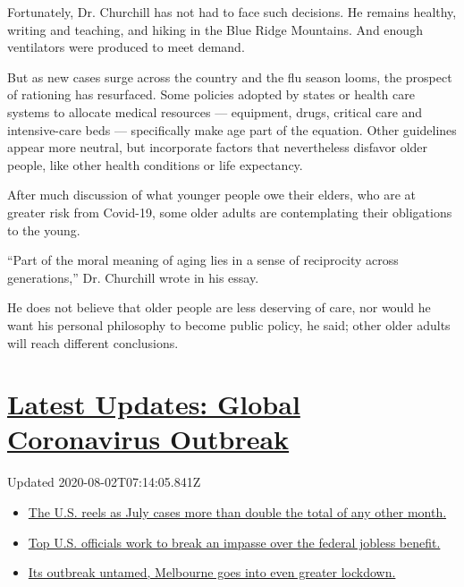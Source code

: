 Fortunately, Dr. Churchill has not had to face such decisions. He
remains healthy, writing and teaching, and hiking in the Blue Ridge
Mountains. And enough ventilators were produced to meet demand.

But as new cases surge across the country and the flu season looms, the
prospect of rationing has resurfaced. Some policies adopted by states or
health care systems to allocate medical resources --- equipment, drugs,
critical care and intensive-care beds --- specifically make age part of
the equation. Other guidelines appear more neutral, but incorporate
factors that nevertheless disfavor older people, like other health
conditions or life expectancy.

After much discussion of what younger people owe their elders, who are
at greater risk from Covid-19, some older adults are contemplating their
obligations to the young.

``Part of the moral meaning of aging lies in a sense of reciprocity
across generations,'' Dr. Churchill wrote in his essay.

He does not believe that older people are less deserving of care, nor
would he want his personal philosophy to become public policy, he said;
other older adults will reach different conclusions.

\hypertarget{latest-updates-global-coronavirus-outbreak}{%
\section{\texorpdfstring{\href{https://www.nytimes.com/2020/08/01/world/coronavirus-covid-19.html?action=click\&pgtype=Article\&state=default\&region=MAIN_CONTENT_1\&context=storylines_live_updates}{Latest
Updates: Global Coronavirus
Outbreak}}{Latest Updates: Global Coronavirus Outbreak}}\label{latest-updates-global-coronavirus-outbreak}}

Updated 2020-08-02T07:14:05.841Z

\begin{itemize}
\tightlist
\item
  \href{https://www.nytimes.com/2020/08/01/world/coronavirus-covid-19.html?action=click\&pgtype=Article\&state=default\&region=MAIN_CONTENT_1\&context=storylines_live_updates\#link-34047410}{The
  U.S. reels as July cases more than double the total of any other
  month.}
\item
  \href{https://www.nytimes.com/2020/08/01/world/coronavirus-covid-19.html?action=click\&pgtype=Article\&state=default\&region=MAIN_CONTENT_1\&context=storylines_live_updates\#link-780ec966}{Top
  U.S. officials work to break an impasse over the federal jobless
  benefit.}
\item
  \href{https://www.nytimes.com/2020/08/01/world/coronavirus-covid-19.html?action=click\&pgtype=Article\&state=default\&region=MAIN_CONTENT_1\&context=storylines_live_updates\#link-2bc8948}{Its
  outbreak untamed, Melbourne goes into even greater lockdown.}
\end{itemize}

